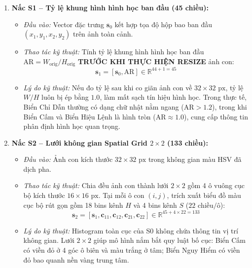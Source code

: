 \documentclass[a4paper, 11pt]{article}
\begin{document}
\begin{enumerate}
    \item \textbf{Nấc S1 -- Tỷ lệ khung hình hình học ban đầu (45 chiều):}
    \begin{itemize}
        \item \textit{Đầu vào:} Vector đặc trưng $\mathbf{s}_0$ kết hợp tọa độ hộp bao ban đầu $(x_1, y_1, x_2, y_2)$ trên ảnh toàn cảnh.
        \item \textit{Thao tác kỹ thuật:} Tính tỷ lệ khung hình hình học ban đầu $\text{AR} = W_{\text{orig}} / H_{\text{orig}}$ \textbf{TRƯỚC KHI THỰC HIỆN RESIZE} ảnh con:
        \begin{equation}
            \mathbf{s}_1 = [\mathbf{s}_0, \text{AR}] \in \mathbb{R}^{44 + 1 = 45}
        \end{equation}
        \item \textit{Lý do kỹ thuật:} Nếu đo tỷ lệ sau khi co giãn ảnh con về $32 \times 32\text{ px}$, tỷ lệ $W/H$ luôn bị ép bằng $1.0$, làm mất sạch tín hiệu hình học. Trong thực tế, Biển Chỉ Dẫn thường có dạng chữ nhật nằm ngang ($\text{AR} > 1.2$), trong khi Biển Cấm và Biển Hiệu Lệnh là hình tròn ($\text{AR} \approx 1.0$), cung cấp thông tin phân định hình học quan trọng.
    \end{itemize}

    \item \textbf{Nấc S2 -- Lưới không gian Spatial Grid $2 \times 2$ (133 chiều):}
    \begin{itemize}
        \item \textit{Đầu vào:} Ảnh con kích thước $32 \times 32\text{ px}$ trong không gian màu HSV đã dịch pha.
        \item \textit{Thao tác kỹ thuật:} Chia đều ảnh con thành lưới $2 \times 2$ gồm 4 ô vuông cục bộ kích thước $16 \times 16\text{ px}$. Tại mỗi ô con $(i, j)$, trích xuất biểu đồ màu cục bộ rút gọn gồm 18 bins kênh $H$ và 4 bins kênh $S$ ($22\text{ chiều/ô}$):
        \begin{equation}
            \mathbf{s}_2 = [\mathbf{s}_1, \mathbf{c}_{11}, \mathbf{c}_{12}, \mathbf{c}_{21}, \mathbf{c}_{22}] \in \mathbb{R}^{45 + 4 \times 22 = 133}
        \end{equation}
        \item \textit{Lý do kỹ thuật:} Histogram toàn cục của S0 không chứa thông tin vị trí không gian. Lưới $2 \times 2$ giúp mô hình nắm bắt quy luật bố cục: Biển Cấm có viền đỏ ở 4 góc ô biên và màu trắng ở tâm; Biển Nguy Hiểm có viền đỏ bao quanh nền vàng trung tâm.
    \end{itemize}


\end{enumerate}
\end{document}
